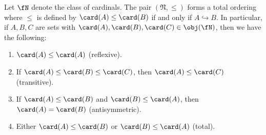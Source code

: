    \begin{theorem}\label{thm:cardinal-orderings}
        Let $\fN$ denote the class of cardinals. The pair $(\mathfrak{N},\leq)$ forms a total ordering \textemdash where $\leq$ is defined by $\card(A) \leq \card(B)$ if and only if $A \hookrightarrow B$. In particular, if $A,B,C$ are sets with $\card(A),\card(B),\card(C) \in \obj(\fN)$, then we have the following:
        \begin{enumerate}[label = (\arabic*)]
            \item $\card(A) \leq \card(A)$ (reflexive).
            \item If $\card(A) \leq \card(B) \leq \card(C)$, then $\card(A) \leq \card(C)$ (transitive).
            \item If $\card(A) \leq \card(B)$ and $\card(B) \leq \card(A)$, then $\card(A) = \card(B)$ (antisymmetric).
            \item  Either $\card(A) \leq \card(B)$ or $\card(B) \leq \card(A)$ (total).
        \end{enumerate}
    \end{theorem}
